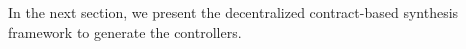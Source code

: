 

In the next section, we present the decentralized contract-based synthesis framework to generate the controllers. 

